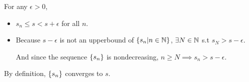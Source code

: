 \begin{enumerate}[label=(\roman*)]
\begin{itemize}
        For any $\epsilon > 0$, 
        \begin{itemize}[label=+)]
            \item $s_n \leq s < s + \epsilon$ for all $n$.
            \item Because $s - \epsilon$ is not an upperbound of $\left\{s_n | n\in\mathbb{N}\right\}$, $\exists N\in\mathbb{N}$ s.t $s_N > s-\epsilon$.
            
            And since the sequence $\left\{s_n\right\}$ is nondecreasing, $n\geq N \implies s_n > s-\epsilon$.
        \end{itemize}
        By definition, $\left\{s_n\right\}$ converges to $s$.
    \end{itemize}
\end{enumerate}
